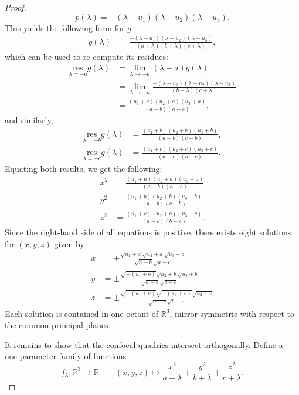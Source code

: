 \documentclass[10pt, a4paper]{article}
\theoremstyle{BoldTopSpacing}
\theoremstyle{BoldTopSpacing}
\theoremstyle{BoldTopSpacing}
\theoremstyle{BoldTopBottomSpacing}
\theoremstyle{BoldTopSpacing}
\theoremstyle{BoldTopBottomSpacing}
\theoremstyle{remark}
\begin{document}
\begin{proof}
\[
    p(\lambda) = -(\lambda - u_{1})(\lambda - u_{2})(\lambda - u_{3}).
\]
This yields the following form for $g$
\begin{align*}
g(\lambda) &= \frac{-(\lambda - u_{1})(\lambda - u_{2})(\lambda - u_{3})}{(a+\lambda)(b+\lambda)(c+\lambda)},
\end{align*}
which can be used to re-compute its residues:
\begin{align*}
\underset{\lambda = -a}{\text{res}} g(\lambda) &= \lim_{\lambda \to -a} (\lambda + a)g(\lambda) \\
&= \lim_{\lambda \to -a} \frac{-(\lambda - u_{1})(\lambda - u_{2})(\lambda - u_{3})}{(b+\lambda)(c+\lambda)} \\
&= \frac{(u_{1} + a)(u_{2} + a)(u_{3} + a)}{(a-b)(a-c)},
\end{align*}
and similarly,
\begin{align*}
\underset{\lambda = -b}{\text{res}} g(\lambda) &= \frac{(u_{1} + b)(u_{2} + b)(u_{3} + b)}{(a-b)(c-b)}, \\
\underset{\lambda = -c}{\text{res}} g(\lambda) &= \frac{(u_{1} + c)(u_{2} + c)(u_{3} + c)}{(a-c)(b-c)}.
\end{align*}
Equating both results, we get the following:
\begin{align}
\label{eq:squared-xyz-form}
x^2 &= \frac{(u_{1} + a)(u_{2} + a)(u_{3} + a)}{(a-b)(a-c)} \\
y^2 &= \frac{(u_{1} + b)(u_{2} + b)(u_{3} + b)}{(a-b)(c-b)} \\
z^2 &= \frac{(u_{1} + c)(u_{2} + c)(u_{3} + c)}{(a-c)(b-c)}.
\end{align}
Since the right-hand side of all equations is positive, there exists eight solutions for $(x, y, z)$ given by
\begin{align}
\label{eq:sqrt-root-parameterization}
x &= \pm \frac{\sqrt{u_{1} + a}\sqrt{u_{2} + a}\sqrt{u_{3} + a }}{\sqrt{a-b}\sqrt{a-c}} \\
y &= \pm \frac{\sqrt{-(u_{1} + b)}\sqrt{u_{2} + b}\sqrt{u_{3} + b}}{\sqrt{a-b}\sqrt{b-c}} \\
z &= \pm \frac{\sqrt{-(u_{1} + c)}\sqrt{-(u_{2} + c)}\sqrt{u_{3} + c}}{\sqrt{a-c}\sqrt{b-c}}
\end{align}
Each solution is contained in one octant of $\mathbb{R}^3$, mirror symmetric with respect to the common principal planes. \par
It remains to show that the confocal quadrics intersect orthogonally. Define a one-parameter family of functions
\[
    f_{\lambda} : \mathbb{R}^3 \to \mathbb{R} \quad \quad (x, y, z) \mapsto \frac{x^2}{a + \lambda} + \frac{y^2}{b + \lambda} + \frac{z^2}{c + \lambda}.
\]
\end{proof}
\end{document}
